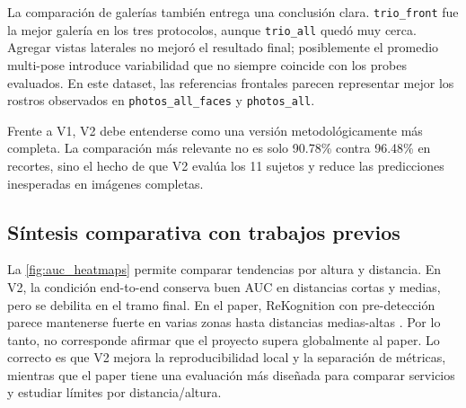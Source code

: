 \documentclass[11pt]{article}
\begin{document}
La comparaci\'on de galer\'ias tambi\'en entrega una conclusi\'on clara. \texttt{trio\_front} fue la mejor galer\'ia en los tres protocolos, aunque \texttt{trio\_all} qued\'o muy cerca. Agregar vistas laterales no mejor\'o el resultado final; posiblemente el promedio multi-pose introduce variabilidad que no siempre coincide con los probes evaluados. En este dataset, las referencias frontales parecen representar mejor los rostros observados en \texttt{photos\_all\_faces} y \texttt{photos\_all}.

Frente a V1, V2 debe entenderse como una versi\'on metodol\'ogicamente m\'as completa. La comparaci\'on m\'as relevante no es solo 90.78\% contra 96.48\% en recortes, sino el hecho de que V2 eval\'ua los 11 sujetos y reduce las predicciones inesperadas en im\'agenes completas.

\subsection{S\'intesis comparativa con trabajos previos}
\label{sec:discusion_comparativa}

La \autoref{fig:auc_heatmaps} permite comparar tendencias por altura y distancia. En V2, la condici\'on end-to-end conserva buen AUC en distancias cortas y medias, pero se debilita en el tramo final. En el paper, ReKognition con pre-detecci\'on parece mantenerse fuerte en varias zonas hasta distancias medias-altas \cite{hsu2015issues}. Por lo tanto, no corresponde afirmar que el proyecto supera globalmente al paper. Lo correcto es que V2 mejora la reproducibilidad local y la separaci\'on de m\'etricas, mientras que el paper tiene una evaluaci\'on m\'as dise\~nada para comparar servicios y estudiar l\'imites por distancia/altura.
\end{document}
